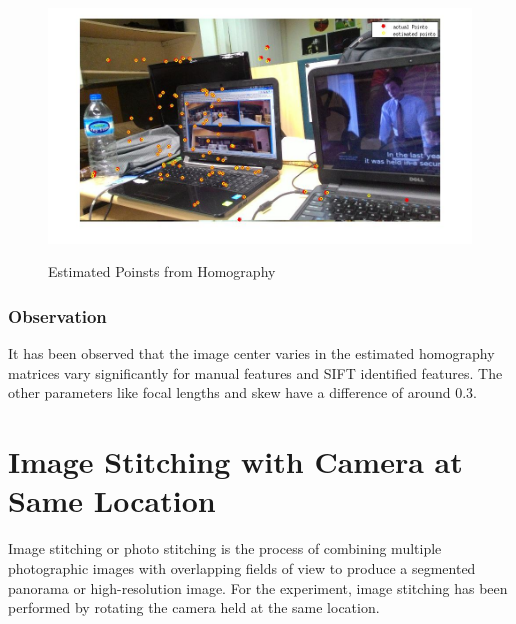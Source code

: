 \documentclass[12pt]{article}
\begin{document}
\begin{figure}[htp]
\centering
\includegraphics[width=1\textwidth]{ransacPtsift.jpg}\hfill
\label{ransacsift}
\caption{Estimated Poinsts from Homography}
\end{figure}

\clearpage
\subsubsection{Observation}
It has been observed that the image center varies in the estimated homography matrices vary significantly for manual features and SIFT identified features. The other parameters like focal lengths and skew have a difference of around 0.3. 

\section{Image Stitching with Camera at Same Location}
Image stitching or photo stitching is the process of combining multiple photographic images with overlapping fields of view to produce a segmented panorama or high-resolution image. For the experiment, image stitching has been performed by rotating the camera held at the same location.
\end{document}
